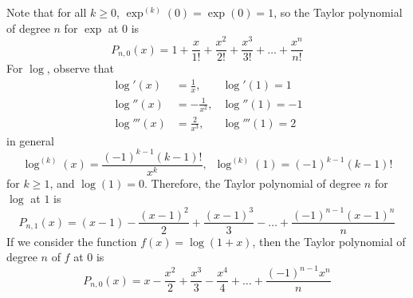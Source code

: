 \documentclass[12pt, a4paper, oneside, openright, titlepage]{book}
\begin{document}
\begin{eg}
    Note that for all $k \geq 0$, $\exp^{(k)}(0) = \exp(0) = 1$, so the Taylor polynomial of degree $n$ for $\exp$ at $0$ is \begin{equation*}
        P_{n,0}(x) = 1 + \frac{x}{1!} + \frac{x^2}{2!} + \frac{x^3}{3!} + \hdots + \frac{x^n}{n!}
    \end{equation*}
    For $\log$, observe that \begin{align*}
        \log'(x) &= \frac{1}{x}, &\log'(1) = 1 \\
        \log''(x) &= -\frac{1}{x^2}, &\log''(1) = -1 \\
        \log'''(x) &= \frac{2}{x^3}, &\log'''(1) = 2
    \end{align*}
    in general \begin{equation*}
        \log^{(k)}(x) = \frac{(-1)^{k-1}(k-1)!}{x^k}, \;\;\log^{(k)}(1) = (-1)^{k-1}(k-1)!
    \end{equation*}
    for $k \geq 1$, and $\log(1) =0$. Therefore, the Taylor polynomial of degree $n$ for $\log$ at $1$ is \begin{equation*}
        P_{n,1}(x) = (x-1) -\frac{(x-1)^2}{2} +\frac{(x-1)^3}{3} - \hdots + \frac{(-1)^{n-1}(x-1)^n}{n}
    \end{equation*}
    If we consider the function $f(x) = \log(1+x)$, then the Taylor polynomial of degree $n$ of $f$ at $0$ is \begin{equation*}
        P_{n,0}(x) = x - \frac{x^2}{2} + \frac{x^3}{3} - \frac{x^4}{4} + \hdots + \frac{(-1)^{n-1}x^n}{n}
    \end{equation*}
\end{eg}
\end{document}

